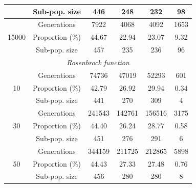 \documentclass[final,1p,times]{elsarticle}
\begin{document}
\begin{table}
{\begin{tabular}{|c|c|c|c|c|c|}
                     & Sub-pop. size &  446   & 248    &  232    & 98   \\ \hline    
\multirow{3}{*}{15000} & Generations & 7922   & 4068   & 4092    & 1653      \\ \cline{2-6}
                     & Proportion  (\%)  &  44.67 &  22.94 &  23.07  & 9.32     \\ \cline{2-6}
                     & Sub-pop. size & 457    & 235    & 236 & 96      \\ \hline    
\multicolumn{6}{|c|}{{\em Rosenbrock function}} \\ \hline
\multirow{3}{*}{10} & Generations   & 74736   &47019   & 52293   & 601     \\ \cline{2-6}
                     & Proportion (\%)   & 42.79  &  26.92 &   29.94 &   0.34    \\ \cline{2-6}
                     & Sub-pop. size &  441  & 270     & 309     & 4      \\ \hline    
\multirow{3}{*}{30} & Generations   	&  241543 &   142761 & 156516 & 3175     \\ \cline{2-6}
                     & Proportion  (\%)  & 44.40 &   26.24   & 28.77  & 0.58   \\ \cline{2-6}
                     & Sub-pop. size & 451 &  276 & 291 & 6       \\ \hline    
\multirow{3}{*}{50} & Generations   &  344159 &  211725 & 212865 & 5898    \\ \cline{2-6}
                     & Proportion  (\%)  & 44.43  &  27.33  & 27.48  & 0.76     \\ \cline{2-6}
                     & Sub-pop. size & 456 & 280 & 280 & 8      \\ \hline  
\end{tabular}
\label{table:generations4X}
}
\end{table}
\end{document}

